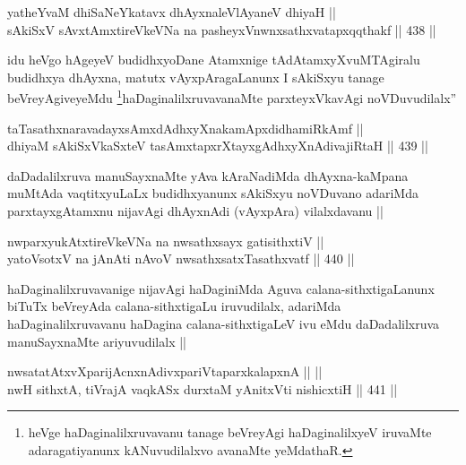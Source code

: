 \begin{shl}
yatheYvaM dhiSaNeYkatavx dhAyxnaleVlAyaneV dhiyaH || \\
sAkiSxV sAvxtAmxtireVkeVNa na pasheyxVnwnxsathxvatapxqqthakf ||  438 ||  
\end{shl}

\begin{artha}
idu heVgo hAgeyeV budidhxyoDane Atamxnige tAdAtamxyXvuMTAgiralu budidhxya dhAyxna, matutx vAyxpAragaLanunx I sAkiSxyu tanage beVreyAgiveyeMdu \footnote{heVge haDaginalilxruvavanu tanage beVreyAgi haDaginalilxyeV iruvaMte adaragatiyanunx kANuvudilalxvo avanaMte yeMdathaR.}haDaginalilxruvavanaMte parxteyxVkavAgi noVDuvudilalx''
\end{artha}


\begin{shl}
taTasathxnaravadayxsAmxdAdhxyXnakamApxdidhamiRkAmf ||  \\
dhiyaM sAkiSxVkaSxteV tasAmxtapxrXtayxgAdhxyXnAdivajiRtaH ||  439 ||  
\end{shl}

\begin{artha}
daDadalilxruva manuSayxnaMte yAva kAraNadiMda dhAyxna-kaMpana muMtAda vaqtitxyuLaLx budidhxyanunx sAkiSxyu noVDuvano adariMda parxtayxgAtamxnu nijavAgi dhAyxnAdi (vAyxpAra) vilalxdavanu ||
\end{artha}


\begin{shl}
nwparxyukAtxtireVkeVNa na nwsathxsayx gatisithxtiV || \\
yatoV\s sotxV na jAnAti nAvoV nwsathxsatxTasathxvatf ||  440 ||  
\end{shl}

\begin{artha}
haDaginalilxruvavanige nijavAgi haDaginiMda Aguva calana-sithxtigaLanunx biTuTx beVreyAda calana-sithxtigaLu iruvudilalx, adariMda haDaginalilxruvavanu haDagina calana-sithxtigaLeV ivu eMdu daDadalilxruva manuSayxnaMte ariyuvudilalx ||
\end{artha}

\begin{shl}
nwsatatAtxvXparijAcnxnAdivxpariVtaparxkalapxnA ||  || \\
nwH sithxtA, tiVrajA vaqkASx durxtaM yAnitxVti nishicxtiH ||  441 ||  
\end{shl}

